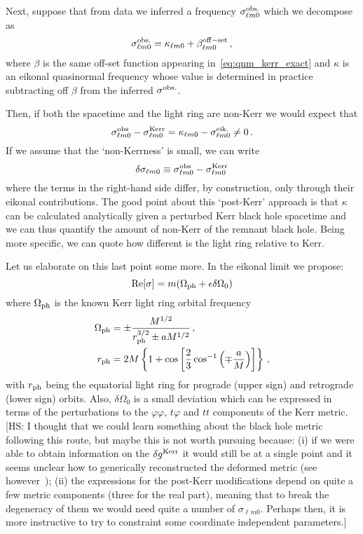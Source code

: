 \documentclass[aps,10pt,preprint,
               notitlepage,onecolumn,superscriptaddress,
               eqsecnum,
               nofootinbib,tightenlines,floatfix]{revtex4-1}
\newcommand{\hs}[1]{{\color{magenta}[HS: #1]}}
\begin{document}
Next, suppose that from data we inferred a frequency $\sigma_{\ell m 0}^{\rm obs.}$
which we decompose as
%
\begin{equation}
    \sigma_{\ell m 0}^{\rm obs.} = \kappa_{\ell m 0} + \beta_{\ell m 0}^{\rm off-set}\,,
\end{equation}
%
where $\beta$ is the same off-set function appearing
in~\eqref{eq:qnm_kerr_exact} and $\kappa$ is an eikonal quasinormal frequency
whose value is determined in practice subtracting off $\beta$ from the inferred
$\sigma^{\rm obs.}$.

Then, if both the spacetime and the light ring are non-Kerr
we would expect that
%
\begin{equation}
    \sigma_{\ell m 0}^{\rm obs} - \sigma_{\ell m 0}^{\rm Kerr} = \kappa_{\ell m 0} - \sigma^{\rm eik.}_{\ell m 0} \neq 0 \,.
    \label{eq:qnm_obs}
\end{equation}
%
If we assume that the `non-Kerrness' is small, we can write
%
\begin{equation}
    \delta \sigma_{\ell m 0} \equiv  \sigma_{\ell m 0}^{\rm obs} - \sigma_{\ell m 0}^{\rm Kerr}
\end{equation}
%
where the terms in the right-hand side differ, by construction, only through their eikonal contributions.
%
The good point about this `post-Kerr' approach is that $\kappa$ can be
calculated analytically given a perturbed Kerr black hole spacetime and we can
thus quantify the amount of non-Kerr of the remnant black hole.
%
Being more specific, we can quote how different is the light ring relative to Kerr.

Let us elaborate on this last point some more. In the eikonal limit we propose:
%
\begin{equation}
    {\rm Re}[\sigma] = m (\Omega_{\rm ph} + \epsilon \delta \Omega_0)
\end{equation}
%
where $\Omega_{\rm ph}$ is the known Kerr light ring orbital frequency
%
\begin{align}
    \Omega_{\rm ph} &= \pm \frac{M^{1/2}}{r_{\rm ph}^{3/2} \pm a M^{1/2}} \,,
    \\
    r_{\rm ph} &= 2M \left\{
    1 + \cos\left[ \frac{2}{3} \cos^{-1} \left( \mp \frac{a}{M} \right)\right]
    \right\}\,,
\end{align}
%
with $r_{\rm ph}$ being the equatorial light ring for prograde (upper sign) and
retrograde (lower sign) orbits. Also, $\delta \Omega_0$ is a small deviation
which can be expressed in terms of the perturbations to the $\varphi\varphi$,
$t\varphi$ and $tt$ components of the Kerr metric.
%
\hs{I thought that we could learn something about the black hole metric
following this route, but maybe this is not worth pursuing because:
%
(i) if we were able to obtain information on the $\delta g^{\rm Kerr}$
it would still be at a single point and it seems unclear how to generically reconstructed
the deformed metric (see however~\cite{Volkel:2020daa});
%
(ii) the expressions for the post-Kerr modifications depend on quite a few
metric components (three for the real part), meaning that to break the degeneracy of
them we would need quite a number of $\sigma_{\ell m 0}$.
%
Perhaps then, it is more instructive to try to constraint some coordinate independent
parameters.}
%
\end{document}
